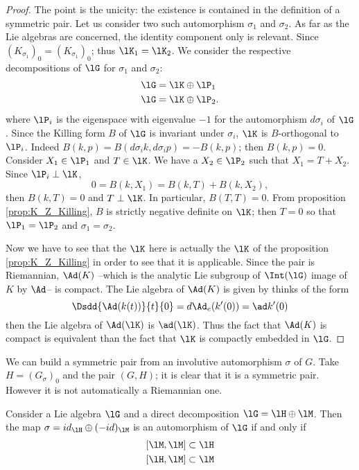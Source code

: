 \begin{proof}
The point is the unicity: the existence is contained in the definition of a symmetric pair. Let us consider two such automorphism $\sigma_1$ and $\sigma_2$. As far as the Lie algebras are concerned, the identity component only is relevant. Since $(K_{\sigma_1})_0=(K_{\sigma_1})_0$; thus $\lK_1=\lK_2$. We consider the respective decompositions of $\lG$ for $\sigma_1$ and $\sigma_2$:
\begin{subequations}
\begin{align}
  \lG&=\lK\oplus\lP_1\\
  \lG&=\lK\oplus\lP_2.
\end{align}
\end{subequations}
where $\lP_i$ is the eigenspace with eigenvalue $-1$ for the automorphism $d\sigma_i$ of $\lG$. Since the Killing form $B$ of $\lG$ is invariant under $\sigma_i$, $\lK$ is $B$-orthogonal to $\lP_i$. Indeed $B(k,p)=B(d\sigma_i k,d\sigma_ip)=-B(k,p)$; then $B(k,p)=0$. Consider $X_1\in\lP_1$ and $T\in\lK$. We have a $X_2\in\lP_2$ such that $X_1=T+X_2$. Since $\lP_i\perp\lK$,
\[
  0=B(k,X_1)=B(k,T)+B(k,X_2),
\]
then $B(k,T)=0$ and $T\perp\lK$. In particular, $B(T,T)=0$. From proposition \ref{prop:K_Z_Killing}, $B$ is strictly negative definite on $\lK$; then $T=0$ so that $\lP_1=\lP_2$ and $\sigma_1=\sigma_2$.

Now we have to see that the $\lK$ here is actually the $\lK$ of the proposition \ref{prop:K_Z_Killing} in order to see that it is applicable. Since the pair is Riemannian, $\Ad(K)$ --which is the analytic Lie subgroup of $\Int(\lG)$ image of $K$ by $\Ad$-- is compact. The Lie algebra of $\Ad(K)$ is given by thinks of the form
\begin{equation}
  \Dsdd{ \Ad(k(t)) }{t}{0}=d\Ad_e(k'(0))
                          =\ad k'(0) 
\end{equation}
then the Lie algebra of $\Ad(\lK)$ is $\ad(\lK)$. Thus the fact that $\Ad(K)$ is compact is equivalent than the fact that $\lK$ is compactly embedded in $\lG$.

\end{proof}

We can build a symmetric pair from an involutive automorphism $\sigma$ of $G$. Take $H=(G_{\sigma})_0$ and the pair $(G,H)$; it is clear that it is a symmetric pair. However it is not automatically a Riemannian one.

\begin{proposition}
Consider a Lie algebra $\lG$ and a direct decomposition $\lG=\lH\oplus\lM$. Then the map $\sigma=id_{\lH}\oplus(-id)_{\lM}$ is an automorphism of $\lG$ if and only if
\begin{subequations}
\begin{align}
  [\lM,\lM]&\subset\lH\\
  [\lH,\lM]&\subset\lM
\end{align}   
\end{subequations}
\label{prop:invol_ssi_comm}
\end{proposition}

